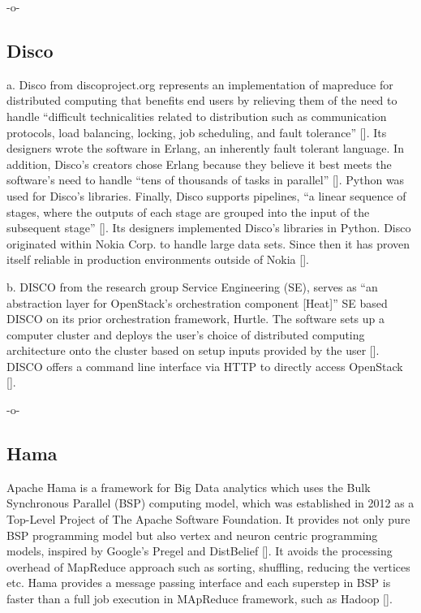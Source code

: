      -o-

     
\subsection{Disco}

a. Disco from discoproject.org represents an implementation of
mapreduce for distributed computing that benefits end users by
relieving them of the need to handle ``difficult technicalities
related to distribution such as communication protocols, load
balancing, locking, job scheduling, and fault
tolerance'' [\cite{www-whatis-discoproject}]. Its designers wrote the
software in Erlang, an inherently fault tolerant language. In
addition, Disco's creators chose Erlang because they believe it best
meets the software's need to handle ``tens of thousands of tasks in
parallel'' [\cite{www-erlangprime-discoproject}]. Python was used for
Disco's libraries. Finally, Disco supports pipelines, ``a linear
sequence of stages, where the outputs of each stage are grouped into
the input of the subsequent
stage'' [\cite{www-clarridge-discoproject}]. Its designers implemented
Disco's libraries in Python. Disco originated within Nokia Corp. to
handle large data sets.  Since then it has proven itself reliable in
production environments outside of
Nokia [\cite{www-nokia-discoproject}].

b. DISCO from the research group Service Engineering (SE), serves as
``an abstraction layer for OpenStack's orchestration component
[Heat]'' SE based DISCO on its prior orchestration framework,
Hurtle. The software sets up a computer cluster and deploys the user's
choice of distributed computing architecture onto the cluster based on
setup inputs provided by the
user [\cite{www-discoabout-discoabstractionlayer}].  DISCO offers a
command line interface via HTTP to directly access
OpenStack [\cite{www-discodescribed-discoabstractionlayer}].

     -o-

\subsection{Hama}

Apache Hama is a framework for Big Data analytics which uses the Bulk
Synchronous Parallel (BSP) computing model, which was established in
2012 as a Top-Level Project of The Apache Software Foundation. It
provides not only pure BSP programming model but also vertex and
neuron centric programming models, inspired by Google's Pregel and
DistBelief [\cite{apache-hama}]. It avoids the processing overhead of
MapReduce approach such as sorting, shuffling, reducing the vertices
etc. Hama provides a message passing interface and each superstep in
BSP is faster than a full job execution in MApReduce framework, such
as Hadoop [\cite{book-hama}].
     
